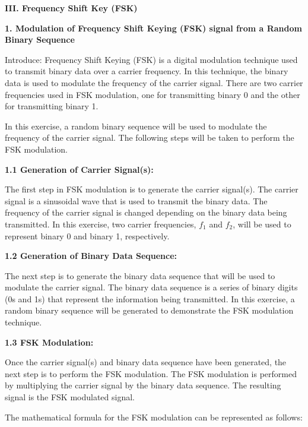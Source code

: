 \documentclass{article} %
\begin{document}


\noindent \textbf{III. Frequency Shift Key (FSK)}

\noindent \textbf{1. Modulation of Frequency Shift Keying (FSK) signal from a Random Binary Sequence}

\noindent Introduce: Frequency Shift Keying (FSK) is a digital modulation technique used to transmit binary data over a carrier frequency. In this technique, the binary data is used to modulate the frequency of the carrier signal. There are two carrier frequencies used in FSK modulation, one for transmitting binary 0 and the other for transmitting binary 1.

\noindent In this exercise, a random binary sequence will be used to modulate the frequency of the carrier signal. The following steps will be taken to perform the FSK modulation.

\noindent 

\noindent \textbf{1.1 Generation of Carrier Signal(s):}

\noindent The first step in FSK modulation is to generate the carrier signal(s). The carrier signal is a sinusoidal wave that is used to transmit the binary data. The frequency of the carrier signal is changed depending on the binary data being transmitted. In this exercise, two carrier frequencies, $f_1$ and $f_2$, will be used to represent binary 0 and binary 1, respectively.

\noindent 

\noindent \textbf{1.2 Generation of Binary Data Sequence:}

\noindent The next step is to generate the binary data sequence that will be used to modulate the carrier signal. The binary data sequence is a series of binary digits (0s and 1s) that represent the information being transmitted. In this exercise, a random binary sequence will be generated to demonstrate the FSK modulation technique.

\noindent 

\noindent \textbf{1.3 FSK Modulation:}

\noindent Once the carrier signal(s) and binary data sequence have been generated, the next step is to perform the FSK modulation. The FSK modulation is performed by multiplying the carrier signal by the binary data sequence. The resulting signal is the FSK modulated signal.

\noindent The mathematical formula for the FSK modulation can be represented as follows:
\end{document}
